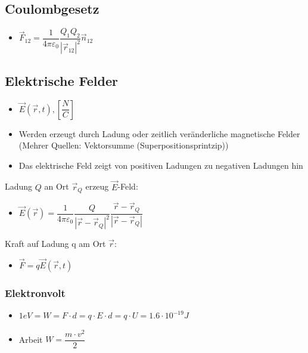 \documentclass[8pt,a4paper]{scrartcl}
\begin{document}
\begin{multicols*}{3}
			
			
			
			
			\subsection{Coulombgesetz}
				\begin{itemize}\itemsep0pt
					\item $\overrightarrow{F}_{12}=\dfrac{1}{4\pi\varepsilon_{0}}\dfrac{Q_{1}Q_{2}}{|\overrightarrow{r}_{12}|^{2}}\overrightarrow{n}_{12}$
				\end{itemize}
			
			\subsection{Elektrische Felder}
			
				\begin{itemize}\itemsep0pt
					\item $\overrightarrow{E}(\overrightarrow{r},t), [\dfrac{N}{C}]$
					\item Werden erzeugt durch Ladung oder zeitlich veränderliche magnetische Felder (Mehrer Quellen: Vektorsumme (Superpositionsprintzip))
					\item Das elektrische Feld zeigt von positiven Ladungen zu negativen Ladungen hin
				\end{itemize}
			
				Ladung $Q$ an Ort $\overrightarrow{r}_{Q}$ erzeug $\overrightarrow{E}$-Feld:		
				\begin{itemize}\itemsep0pt
					\item $\overrightarrow{E}(\overrightarrow{r}) = \dfrac{1}{4\pi\varepsilon_{0}} \dfrac{Q}{|\overrightarrow{r}-\overrightarrow{r}_{Q}|^{2}}  \dfrac{\overrightarrow{r}-\overrightarrow{r}_{Q}}{|\overrightarrow{r}-\overrightarrow{r}_{Q}|}$
					
				\end{itemize}
				Kraft auf Ladung q am Ort 
				$\overrightarrow{r}$:
				\begin{itemize}\itemsep0pt
					\item $\overrightarrow{F}=q\overrightarrow{E}(\overrightarrow{r},t)$
				\end{itemize}
			\subsubsection{Elektronvolt}
				\begin{itemize}\itemsep0pt
					\item $1 eV = W = F \cdot d =q\cdot E\cdot d=q \cdot U= 1.6\cdot10^{-19}J$
					\item Arbeit $W=\dfrac{m\cdot v^{2}}{2}$
				\end{itemize}

\end{multicols*}
\end{document}
